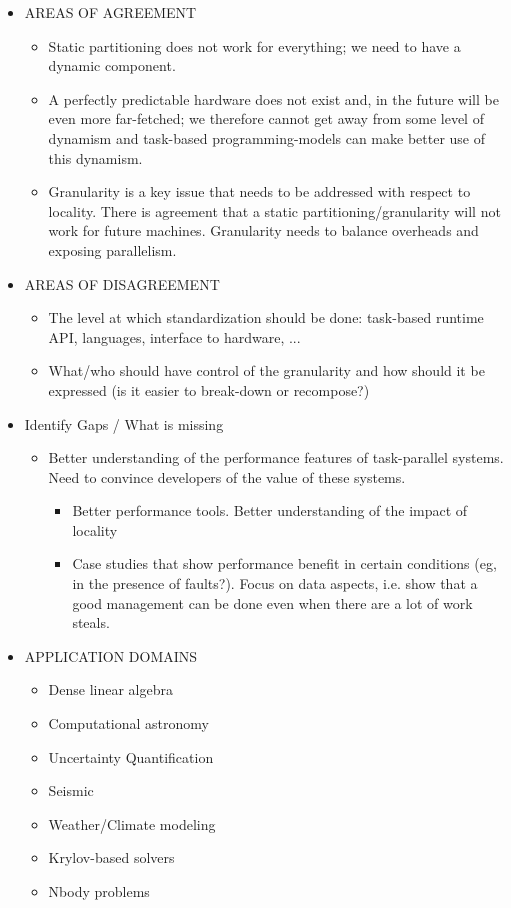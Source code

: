 \begin{itemize}
			
			
	\item AREAS OF AGREEMENT
		  \begin{itemize}
		  \item Static partitioning does not work for everything; we need to
		      have a dynamic component.
		  \item A perfectly predictable hardware does not exist and, in the
		      future will be even more far-fetched; we therefore cannot get
		      away from some level of dynamism and task-based
		      programming-models can make better use of this dynamism.
		  \item Granularity is a key issue that needs to be addressed with
		      respect to locality. There is agreement that a static
		      partitioning/granularity will not work for future
		      machines. Granularity needs to balance overheads and exposing
		      parallelism.
		  \end{itemize}
	
	
	
	\item AREAS OF DISAGREEMENT
		  \begin{itemize}
		  \item The level at which standardization should be done: task-based
		      runtime API, languages, interface to hardware, ...
		  \item What/who should have control of the granularity and how should
		      it be expressed (is it easier to break-down or recompose?)
		  \end{itemize}


	\item Identify Gaps / What is missing
	    \begin{itemize}
		
		\item Better understanding of the performance features of task-parallel
		systems. Need to convince developers of the value of these systems. 
		\begin{itemize}
		  \item Better performance tools. Better understanding of the impact of locality
		  \item Case studies that show performance benefit in certain conditions (eg,
		    in the presence of faults?). Focus on data aspects, i.e. show that
		a good management can be done even when there are a lot of work steals. 
	      \end{itemize}  
	  \end{itemize}  

	\item APPLICATION DOMAINS
		\begin{itemize}
			\item Dense linear algebra
			\item Computational astronomy
			\item Uncertainty Quantification
			\item Seismic
			\item Weather/Climate modeling
			\item Krylov-based solvers
			\item Nbody problems
		\end{itemize}

\end{itemize}
